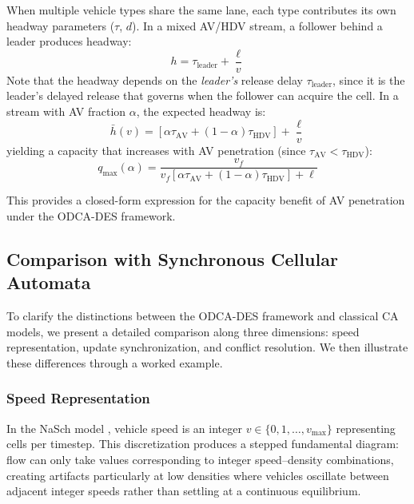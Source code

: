 \documentclass[review,authoryear]{elsarticle}
\begin{document}
When multiple vehicle types share the same lane, each type contributes its own headway parameters ($\tau$, $d$). In a mixed AV/HDV stream, a follower behind a leader produces headway:
\begin{equation}
    h = \tau_{\text{leader}} + \frac{\ell}{v}
    \label{eq:mixed_headway}
\end{equation}
Note that the headway depends on the \emph{leader's} release delay $\tau_{\text{leader}}$, since it is the leader's delayed release that governs when the follower can acquire the cell. In a stream with AV fraction $\alpha$, the expected headway is:
\begin{equation}
    \bar{h}(v) = \left[\alpha \tau_{\text{AV}} + (1-\alpha)\tau_{\text{HDV}}\right] + \frac{\ell}{v}
    \label{eq:mixed_avg_headway}
\end{equation}
yielding a capacity that increases with AV penetration (since $\tau_{\text{AV}} < \tau_{\text{HDV}}$):
\begin{equation}
    q_{\max}(\alpha) = \frac{v_f}{v_f\left[\alpha \tau_{\text{AV}} + (1-\alpha)\tau_{\text{HDV}}\right] + \ell}
    \label{eq:mixed_capacity}
\end{equation}

This provides a closed-form expression for the capacity benefit of AV penetration under the ODCA-DES framework.


\subsection{Comparison with Synchronous Cellular Automata}
\label{sec:ca_comparison}

To clarify the distinctions between the ODCA-DES framework and classical CA models, we present a detailed comparison along three dimensions: speed representation, update synchronization, and conflict resolution. We then illustrate these differences through a worked example.

\subsubsection{Speed Representation}

In the NaSch model \citep{nagel1992cellular}, vehicle speed is an integer $v \in \{0, 1, \ldots, v_{\max}\}$ representing cells per timestep. This discretization produces a stepped fundamental diagram: flow can only take values corresponding to integer speed--density combinations, creating artifacts particularly at low densities where vehicles oscillate between adjacent integer speeds rather than settling at a continuous equilibrium.
\end{document}
